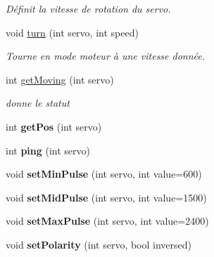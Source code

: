 \begin{DoxyCompactItemize}
\begin{DoxyCompactList}\small\item\em Définit la vitesse de rotation du servo. \end{DoxyCompactList}\item 
\mbox{\label{classServoDriver_ad68ebde8a710451c8fea2cd03cfa4bc0}} 
void \hyperlink{classServoDriver_ad68ebde8a710451c8fea2cd03cfa4bc0}{turn} (int servo, int speed)
\begin{DoxyCompactList}\small\item\em Tourne en mode moteur à une vitesse donnée. \end{DoxyCompactList}\item 
int \hyperlink{classServoDriver_a0a8e84f0bbcff39549ddfc239f1a6237}{get\+Moving} (int servo)
\begin{DoxyCompactList}\small\item\em donne le statut \end{DoxyCompactList}\item 
\mbox{\label{classServoDriver_a53c3d2e48084d579a2a570b97220c835}} 
int {\bfseries get\+Pos} (int servo)
\item 
\mbox{\label{classServoDriver_a952fbbfdbf9d0b57d5c6d6c09019b366}} 
int {\bfseries ping} (int servo)
\item 
\mbox{\label{classServoDriver_a40ec259cb0ced3154b1e73cc52d48938}} 
void {\bfseries set\+Min\+Pulse} (int servo, int value=600)
\item 
\mbox{\label{classServoDriver_a92d53f7f50a7eb95e14ae358ad0b7d23}} 
void {\bfseries set\+Mid\+Pulse} (int servo, int value=1500)
\item 
\mbox{\label{classServoDriver_aaaeaab97cef5c2ebcd05c265fdff747f}} 
void {\bfseries set\+Max\+Pulse} (int servo, int value=2400)
\item 
\mbox{\label{classServoDriver_a89b2add38109f20260369e0a0d747bf2}} 
void {\bfseries set\+Polarity} (int servo, bool inversed)
\item 
\mbox{\label{classServoDriver_a108cce4f0dcf60bf443ee932621bc89c}} 

\end{DoxyCompactItemize}
